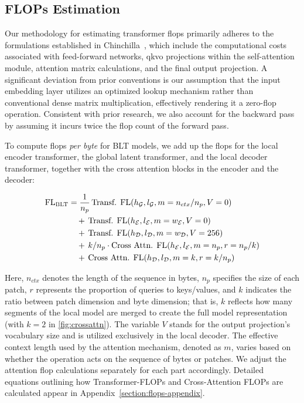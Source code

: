 \subsection{FLOPs Estimation} 
\label{section:flops}

Our methodology for estimating transformer flops primarily adheres to the formulations established in Chinchilla~\citep{hoffmann2022training}, which include the computational costs associated with feed-forward networks, qkvo projections within the self-attention module, attention matrix calculations, and the final output projection. A significant deviation from prior conventions is our assumption that the input embedding layer utilizes an optimized lookup mechanism rather than conventional dense matrix multiplication, effectively rendering it a zero-flop operation. Consistent with prior research, we also account for the backward pass by assuming it incurs twice the flop count of the forward pass.

To compute flops \textit{per byte} for {\textsc BLT} models, we add up the flops for the local encoder transformer, the global latent transformer, and the local decoder transformer, together with the cross attention blocks in the encoder and the decoder:

\begin{align}
    \text{FL}_{\text{{\textsc BLT}}} &= \frac{1}{n_p}\,\text{Transf. FL}(h_{\mathcal{G}}, l_{\mathcal{G}}, m=n_{ctx}/n_p, V=0)\\
   &\quad +\,\text{Transf. FL}(h_{\mathcal{E}}, l_{\mathcal{E}}, m=w_{\mathcal{E}}, V=0) \\
   &\quad +\,\text{Transf. FL}(h_{\mathcal{D}}, l_{\mathcal{D}}, m=w_{\mathcal{D}}, V=256) \\ 
    &\quad +\, k/n_p \cdot \text{Cross Attn. FL}(h_{\mathcal{E}}, l_{\mathcal{E}}, m=n_p, r=n_p/k) \\ 
   &\quad +\, \text{Cross Attn. FL}(h_{\mathcal{D}}, l_{\mathcal{D}}, m=k, r=k/n_p) 
\end{align}

Here, $n_{ctx}$ denotes the length of the sequence in bytes, $n_p$ specifies the size of each patch, $r$ represents the proportion of queries to keys/values, and $k$ indicates the ratio between patch dimension and byte dimension; that is, $k$ reflects how many segments of the local model are merged to create the full model representation (with $k=2$ in \autoref{fig:crossattn}). The variable $V$ stands for the output projection’s vocabulary size and is utilized exclusively in the local decoder. The effective context length used by the attention mechanism, denoted as $m$, varies based on whether the operation acts on the sequence of bytes or patches. We adjust the attention flop calculations separately for each part accordingly. Detailed equations outlining how Transformer-FLOPs and Cross-Attention FLOPs are calculated appear in Appendix~\ref{section:flops-appendix}.

